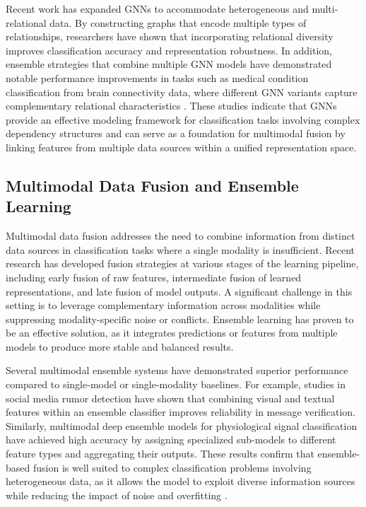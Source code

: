 \documentclass[11pt,a4paper]{article}
\begin{document}
Recent work has expanded GNNs to accommodate heterogeneous and multi-relational data. By constructing graphs that encode multiple types of relationships, researchers have shown that incorporating relational diversity improves classification accuracy and representation robustness. In addition, ensemble strategies that combine multiple GNN models have demonstrated notable performance improvements in tasks such as medical condition classification from brain connectivity data, where different GNN variants capture complementary relational characteristics \citep{ref12}. These studies indicate that GNNs provide an effective modeling framework for classification tasks involving complex dependency structures and can serve as a foundation for multimodal fusion by linking features from multiple data sources within a unified representation space.

\subsection{Multimodal Data Fusion and Ensemble Learning}
Multimodal data fusion addresses the need to combine information from distinct data sources in classification tasks where a single modality is insufficient. Recent research has developed fusion strategies at various stages of the learning pipeline, including early fusion of raw features, intermediate fusion of learned representations, and late fusion of model outputs. A significant challenge in this setting is to leverage complementary information across modalities while suppressing modality-specific noise or conflicts. Ensemble learning has proven to be an effective solution, as it integrates predictions or features from multiple models to produce more stable and balanced results.

Several multimodal ensemble systems have demonstrated superior performance compared to single-model or single-modality baselines. For example, studies in social media rumor detection have shown that combining visual and textual features within an ensemble classifier improves reliability in message verification. Similarly, multimodal deep ensemble models for physiological signal classification have achieved high accuracy by assigning specialized sub-models to different feature types and aggregating their outputs. These results confirm that ensemble-based fusion is well suited to complex classification problems involving heterogeneous data, as it allows the model to exploit diverse information sources while reducing the impact of noise and overfitting \citep{ref13}.
\end{document}
